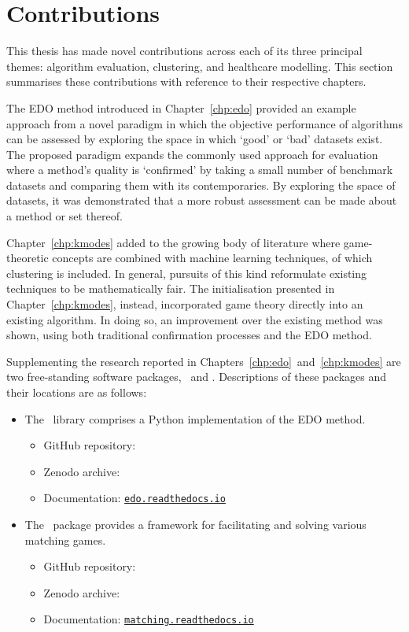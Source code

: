 \section{Contributions}\label{sec:contributions}

This thesis has made novel contributions across each of its three principal
themes: algorithm evaluation, clustering, and healthcare modelling. This section
summarises these contributions with reference to their respective chapters.

The EDO method introduced in Chapter~\ref{chp:edo} provided an example approach
from a novel paradigm in which the objective performance of algorithms can be
assessed by exploring the space in which `good' or `bad' datasets exist. The
proposed paradigm expands the commonly used approach for evaluation where a
method's quality is `confirmed' by taking a small number of benchmark datasets
and comparing them with its contemporaries. By exploring the space of datasets,
it was demonstrated that a more robust assessment can be made about a method or
set thereof.

Chapter~\ref{chp:kmodes} added to the growing body of literature where
game-theoretic concepts are combined with machine learning techniques, of which
clustering is included. In general, pursuits of this kind reformulate existing
techniques to be mathematically fair. The initialisation presented in
Chapter~\ref{chp:kmodes}, instead, incorporated game theory directly into an
existing algorithm. In doing so, an improvement over the existing method was
shown, using both traditional confirmation processes and the EDO method.

Supplementing the research reported in
Chapters~\ref{chp:edo}~and~\ref{chp:kmodes} are two free-standing software
packages, \edo\ and \matching. Descriptions of these packages and their
locations are as follows:

\begin{itemize}
    \item The \edo\ library comprises a Python implementation of the EDO method.
        \begin{itemize}
            \item GitHub repository: 
            \item Zenodo archive: 
            \item Documentation: \href{https://edo.readthedocs.io}{%
                \nolinkurl{edo.readthedocs.io}%
            }
        \end{itemize}
    \item The \matching\ package provides a framework for facilitating and
        solving various matching games.
        \begin{itemize}
            \item GitHub repository: 
            \item Zenodo archive: 
            \item Documentation: \href{https://matching.readthedocs.io}{%
                \nolinkurl{matching.readthedocs.io}%
            }
        \end{itemize}
\end{itemize}

